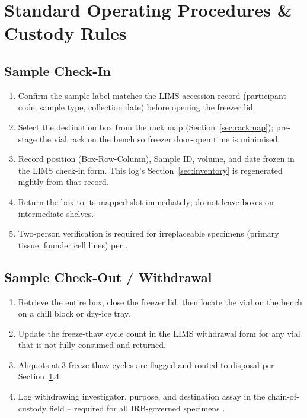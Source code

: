 \section{Standard Operating Procedures \& Custody Rules}
\label{sec:sop}

\subsection{Sample Check-In}
\begin{enumerate}[label=\arabic*., itemsep=2pt, topsep=4pt]
  \item Confirm the sample label matches the LIMS accession record (participant code, sample
        type, collection date) before opening the freezer lid.
  \item Select the destination box from the rack map (Section~\ref{sec:rackmap}); pre-stage
        the vial rack on the bench so freezer door-open time is minimised.
  \item Record position (Box-Row-Column), Sample ID, volume, and date frozen in the LIMS
        check-in form. This log's Section~\ref{sec:inventory} is regenerated nightly from that
        record.
  \item Return the box to its mapped slot immediately; do not leave boxes on intermediate
        shelves.
  \item Two-person verification is required for irreplaceable specimens (primary tissue,
        founder cell lines) per \citet{isber2023}.
\end{enumerate}

\subsection{Sample Check-Out / Withdrawal}
\begin{enumerate}[label=\arabic*., itemsep=2pt, topsep=4pt]
  \item Retrieve the entire box, close the freezer lid, then locate the vial on the bench on
        a chill block or dry-ice tray.
  \item Update the freeze-thaw cycle count in the LIMS withdrawal form for any vial that is
        not fully consumed and returned.
  \item Aliquots at 3 freeze-thaw cycles are flagged  and routed to disposal
        per Section~\ref{sec:sop}.4.
  \item Log withdrawing investigator, purpose, and destination assay in the chain-of-custody
        field -- required for all IRB-governed specimens \citep{nih2016}.
\end{enumerate}

